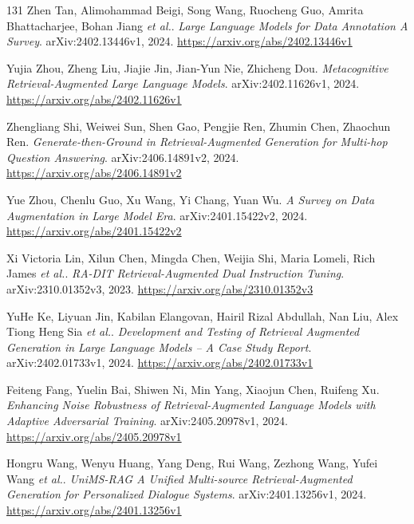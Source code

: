 \documentclass[11pt,a4paper]{article}
\begin{document}
\begin{thebibliography}{131}
Zhen Tan, Alimohammad Beigi, Song Wang, Ruocheng Guo, Amrita Bhattacharjee, Bohan Jiang \emph{et al.}.
\newblock \emph{Large Language Models for Data Annotation A Survey}.
\newblock arXiv:2402.13446v1, 2024.
\newblock \url{https://arxiv.org/abs/2402.13446v1}

Yujia Zhou, Zheng Liu, Jiajie Jin, Jian-Yun Nie, Zhicheng Dou.
\newblock \emph{Metacognitive Retrieval-Augmented Large Language Models}.
\newblock arXiv:2402.11626v1, 2024.
\newblock \url{https://arxiv.org/abs/2402.11626v1}

Zhengliang Shi, Weiwei Sun, Shen Gao, Pengjie Ren, Zhumin Chen, Zhaochun Ren.
\newblock \emph{Generate-then-Ground in Retrieval-Augmented Generation for Multi-hop Question Answering}.
\newblock arXiv:2406.14891v2, 2024.
\newblock \url{https://arxiv.org/abs/2406.14891v2}

Yue Zhou, Chenlu Guo, Xu Wang, Yi Chang, Yuan Wu.
\newblock \emph{A Survey on Data Augmentation in Large Model Era}.
\newblock arXiv:2401.15422v2, 2024.
\newblock \url{https://arxiv.org/abs/2401.15422v2}

Xi Victoria Lin, Xilun Chen, Mingda Chen, Weijia Shi, Maria Lomeli, Rich James \emph{et al.}.
\newblock \emph{RA-DIT Retrieval-Augmented Dual Instruction Tuning}.
\newblock arXiv:2310.01352v3, 2023.
\newblock \url{https://arxiv.org/abs/2310.01352v3}

YuHe Ke, Liyuan Jin, Kabilan Elangovan, Hairil Rizal Abdullah, Nan Liu, Alex Tiong Heng Sia \emph{et al.}.
\newblock \emph{Development and Testing of Retrieval Augmented Generation in Large Language Models -- A Case Study Report}.
\newblock arXiv:2402.01733v1, 2024.
\newblock \url{https://arxiv.org/abs/2402.01733v1}

Feiteng Fang, Yuelin Bai, Shiwen Ni, Min Yang, Xiaojun Chen, Ruifeng Xu.
\newblock \emph{Enhancing Noise Robustness of Retrieval-Augmented Language Models with Adaptive Adversarial Training}.
\newblock arXiv:2405.20978v1, 2024.
\newblock \url{https://arxiv.org/abs/2405.20978v1}

Hongru Wang, Wenyu Huang, Yang Deng, Rui Wang, Zezhong Wang, Yufei Wang \emph{et al.}.
\newblock \emph{UniMS-RAG A Unified Multi-source Retrieval-Augmented Generation for Personalized Dialogue Systems}.
\newblock arXiv:2401.13256v1, 2024.
\newblock \url{https://arxiv.org/abs/2401.13256v1}


\end{thebibliography}
\end{document}
